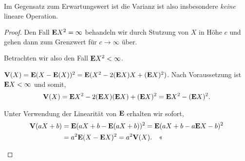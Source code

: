 Im Gegensatz zum Erwartungswert ist die Varianz ist also insbesondere
\textit{keine} lineare Operation.
\begin{proof}
Den Fall $\textbf{E} X^2 = \infty$ behandeln wir durch Stutzung von $X$ in Höhe $c$ und
gehen dann zum Grenzwert für $c\to\infty$ über.

Betrachten wir also den Fall $\textbf{E} X^2 < \infty$.
\begin{proofenum}
  \item $\textbf{V}(X) = \textbf{E}(X-\textbf{E}(X))^2 = \textbf{E}(X^2-2(\textbf{E} X) X + (\textbf{E} X)^2 )$.
Nach Voraussetzung ist $\textbf{E} X<\infty$ und somit,
\begin{align*}
\textbf{V}(X) = \textbf{E} X^2 - 2(\textbf{E} X)(\textbf{E} X) + (\textbf{E} X)^2 = \textbf{E} X^2 - (\textbf{E} X)^2.
\end{align*}
\item Unter Verwendung der Linearität von $\textbf{E}$ erhalten wir sofort,
\begin{align*}
\textbf{V}(a X + b) &= \textbf{E}(a X +b - \textbf{E}(a X + b))^2 = \textbf{E}(aX +b -a \textbf{E} X -b)^2 \\ &=
a^2\textbf{E}(X-\textbf{E} X)^2
= a^2\textbf{V}(X).\quad\text{<<}
\end{align*}
\end{proofenum}
\end{proof}

